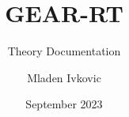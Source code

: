 




\title{GEAR-RT}
\subtitle{Theory Documentation}
\author{Mladen Ivkovic}
\date{September 2023}










\maketitle
\tableofcontents
\clearpage
















\clearpage
\appendix{}



\clearpage





